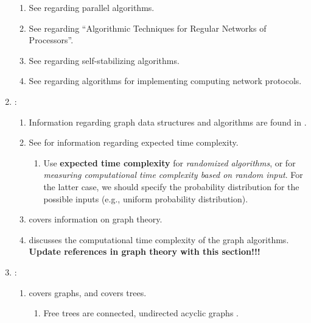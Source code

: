 \begin{enumerate}
	\begin{enumerate} \itemsep -2pt
	\item See \cite[\S25]{Atallah2009a} regarding parallel algorithms.
	\item See \cite[\S24]{Atallah2009a} regarding ``Algorithmic Techniques for Regular Networks of Processors''.
	\item See \cite[\S26]{Atallah2009a} regarding self-stabilizing algorithms.
	\item See \cite[\S28]{Atallah2009a} regarding algorithms for implementing computing network protocols.
	\end{enumerate}
\item \cite{Goldman2008}: \vspace{-0.3cm}
	\begin{enumerate} \itemsep -2pt
	\item Information regarding graph data structures and algorithms are found in \cite[\S51-\S57]{Goldman2008}.
	\item See \cite[\S B.4]{Goldman2008} for information regarding expected time complexity. \vspace{-0.2cm}
		\begin{enumerate} \itemsep -2pt
		\item Use {\bf expected time complexity} for {\it randomized algorithms}, or for {\it measuring computational time complexity based on random input}. For the latter case, we should specify the probability distribution for the possible inputs (e.g., uniform probability distribution). 
		\end{enumerate}
	\item \cite[\S52, pp. 843--844; \S52.2, pp. 845--848]{Goldman2008} covers information on graph theory.
	\item \cite[\S53.8]{Goldman2008} discusses the computational time complexity of the graph algorithms. {\bf Update references in graph theory with this section!!!}
	\end{enumerate}
\item \cite{Cormen2009}: \vspace{-0.3cm}
	\begin{enumerate} \itemsep -2pt
	\item \cite[\S B.4]{Cormen2009} covers graphs, and \cite[\S B.5]{Cormen2009} covers trees. \vspace{-0.2cm}
		\begin{enumerate} \itemsep -2pt
		\item Free trees are connected, undirected acyclic graphs \cite[\S B.5.1, pp. 173]{Cormen2009}.

\end{enumerate}
\end{enumerate}
\end{enumerate}
